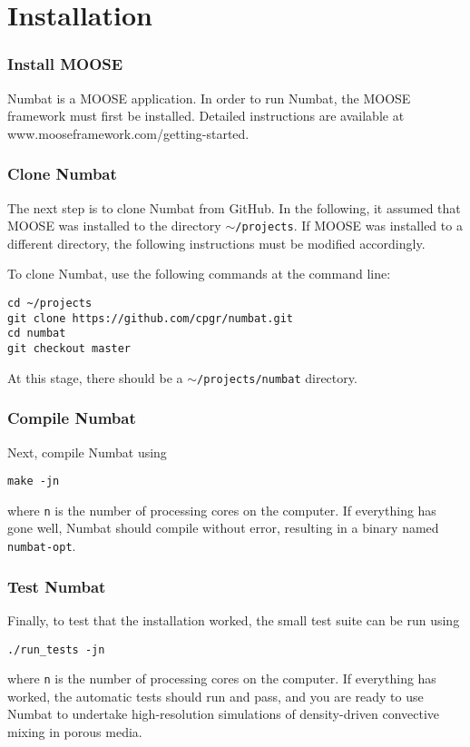 \documentclass[11pt, a4paper]{csiroreport2012}
\begin{document}
\section{Installation}



\subsubsection*{Install MOOSE}
 Numbat is  a MOOSE application. In order to run Numbat, the MOOSE framework must first be installed. Detailed instructions are available at www.mooseframework.com/getting-started.
 
 \subsubsection*{Clone Numbat}
 
 The next step is to clone Numbat from GitHub. In the following, it assumed that MOOSE was installed to the directory \texttt{$\sim$/projects}. If MOOSE was installed to a different directory, the following instructions must be modified accordingly.

To clone Numbat, use the following commands at the command line:

\begin{verbatim}
cd ~/projects
git clone https://github.com/cpgr/numbat.git
cd numbat
git checkout master
\end{verbatim}

At this stage, there should be a \texttt{$\sim$/projects/numbat} directory.

\subsubsection*{Compile Numbat}
Next, compile Numbat using
\begin{verbatim}
make -jn
\end{verbatim}
where \texttt{n} is the number of processing cores on the computer. If everything has gone well, Numbat should compile without error, resulting in a binary named \texttt{numbat-opt}.

\subsubsection*{Test Numbat}
Finally, to test that the installation worked, the small test suite can be run using
\begin{verbatim}
./run_tests -jn
\end{verbatim}
where \texttt{n} is the number of processing cores on the computer. If everything has worked, the automatic tests should run and pass, and you are ready to use Numbat to undertake high-resolution simulations of density-driven convective mixing in porous media.
\end{document}
